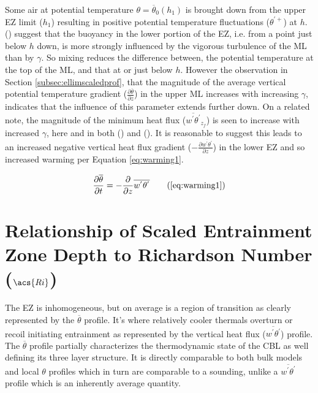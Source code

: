 Some air at potential temperature $\theta = \overline{\theta}_{0}(h_{1})$ is brought down from the upper \acs{EZ} limit ($h_{1}$) resulting in positive potential temperature fluctuations ($\theta^{'+}$) at $h$.\\

\citeauthor{GarciaMellado} (\citeyear{GarciaMellado}) suggest that the buoyancy in the lower portion of the \acs{EZ}, i.e. from a point just below $h$ down, is more strongly influenced by the vigorous turbulence of the \acs{ML} than by $\gamma$.  So mixing reduces the difference between, the potential temperature at the top of the \acs{ML}, and that at or just below $h$.  However the observation in Section \ref{subsec:ellimscaledprof}, that the magnitude of the average vertical potential temperature gradient ($\frac{\partial \overline{\theta}}{\partial z}$) in the upper \acs{ML} increases with increasing $\gamma$, indicates that the influence of this parameter extends further down.  On a related note, the magnitude of the minimum heat flux ($\overline{w^{'}\theta^{'}}_{z_{f}}$) is seen to increase with increased $\gamma$, here and in both \citeauthor{Sorbjan} (\citeyear{Sorbjan}) and \citeauthor{FedConzMir04} (\citeyear{FedConzMir04}).  It is reasonable to suggest this leads to an increased negative vertical heat flux gradient ($-\frac{\partial \overline{w^{'}\theta^{'}}}{\partial z}$) in the lower \acs{EZ} and so increased warming per Equation \ref{eq:warming1}.

\begin{equation}
\frac{\partial \overline{\theta}}{\partial t} = -\frac{\partial}{\partial z}\overline{w^{'}\theta^{'}} \tag{\ref{eq:warming1}}
\end{equation}

\section{Relationship of Scaled Entrainment Zone Depth to Richardson Number ($\acs{Ri}$)}

The \acs{EZ} is inhomogeneous, but on average is a region of transition as clearly represented by the $\overline{\theta}$ profile.  It's where relatively cooler thermals overturn or recoil initiating entrainment as represented by the vertical heat flux ($\overline{w^{'}\theta^{'}}$) profile.  The $\overline{\theta}$ profile partially characterizes the thermodynamic state of the \acs{CBL} as well defining its three layer structure.  It is directly comparable to both bulk models and local $\theta$ profiles which in turn are comparable to a sounding, unlike a $\overline{w^{'}\theta^{'}}$ profile which is an inherently average quantity.\\

